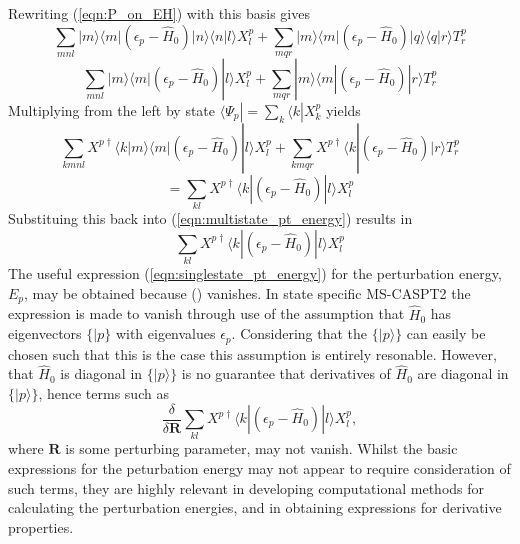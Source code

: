 \documentclass[12pt]{article}
\begin{document}
\noindent Rewriting (\ref{eqn:P_on_EH}) with this basis gives
\begin{equation*}
\sum_{mnl}|m\rangle \langle m | (\epsilon_{p} - \hat{H}_{0})|n\rangle \langle n | l \rangle X_{l}^{p}
+ \sum_{mqr}|m\rangle \langle m | (\epsilon_{p} - \hat{H}_{0})|q\rangle \langle q | r \rangle T_{r}^{p}
\end{equation*}
\begin{equation*}
\sum_{mnl}|m\rangle \langle m | (\epsilon_{p} - \hat{H}_{0})   | l \rangle X_{l}^{p}
+ \sum_{mqr}|m\rangle \langle m | (\epsilon_{p} - \hat{H}_{0}) | r \rangle T_{r}^{p}
\label{eqn:P_on_EH_explicit_bas}
\end{equation*}
Multiplying from the left by state $\langle\Psi_{p}| = \sum_{k}\langle k | X_{k}^{p}$ yields
\begin{equation}
\sum_{kmnl}X^{p\dagger}\langle k | m\rangle \langle m | (\epsilon_{p} - \hat{H}_{0})   | l \rangle X_{l}^{p}
+ \sum_{kmqr}X^{p\dagger}\langle k | (\epsilon_{p} - \hat{H}_{0}) | r \rangle T_{r}^{p}
\end{equation}
\begin{equation}
=  \sum_{kl}X^{p\dagger}\langle k | (\epsilon_{p} - \hat{H}_{0}) | l \rangle X_{l}^{p}
\label{eqn:P_on_EH_ms_nondiag}
\end{equation}
Substituing this back into (\ref{eqn:multistate_pt_energy}) results in 
\begin{equation}
\sum_{kl}X^{p\dagger}\langle k | (\epsilon_{p} - \hat{H}_{0}) | l \rangle X_{l}^{p}
\label{eqn:multistate_PT_energy_nondiag}
\end{equation}
The useful expression (\ref{eqn:singlestate_pt_energy}) for the perturbation energy, $E_{p}$, 
may be obtained because (\label{eqn:P_on_EH_ms_nondiag}) vanishes. In state specific MS-CASPT2
the expression is made to vanish through use of the assumption that $\hat{H}_{0}$ has eigenvectors
$\{|p\}$ with eigenvalues $\epsilon_{p}$. Considering that the
$\{|p\rangle\}$ can easily be chosen such that this is the case this assumption is entirely resonable.
However, that $\hat{H}_{0}$ is diagonal in $\{|p\rangle\}$ is no guarantee that derivatives
of $\hat{H}_{0}$ are diagonal in $\{|p\rangle\}$, hence terms such as 
\begin{equation}
\frac{\delta}{\delta \mathbf{R} }\sum_{kl}X^{p\dagger}\langle k | (\epsilon_{p} - \hat{H}_{0}) | l \rangle X_{l}^{p},
\label{eqn:multistate_PT_energy_nondiag_deriv}
\end{equation}
where $\mathbf{R}$ is some perturbing parameter, may not vanish. Whilst the basic expressions
for the peturbation energy may not appear to require consideration of such terms, they are highly relevant
in developing computational methods for calculating the perturbation energies, and in obtaining expressions
for derivative properties.\\
\end{document}
